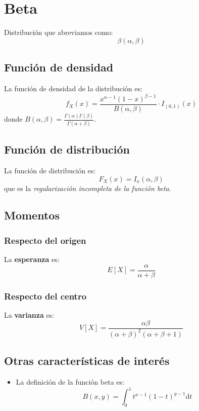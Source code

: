 \section{Beta}
\label{sec:beta}
Distribución que abreviamos como:
\[
\boxed{\beta\left( \alpha, \beta \right)}
\]

\subsection{Función de densidad}
La función de densidad de la distribución es:
\[
f_X \left( x \right) = \frac{x^{\alpha - 1} \left( 1 - x \right)^{\beta - 1}}{B\left( \alpha, \beta \right)} \cdot I_{\left( 0, 1 \right)} \left( x \right)
\]
donde $B\left( \alpha, \beta \right) = \frac{\Gamma\left( \alpha \right)\Gamma\left( \beta \right)}{\Gamma\left( \alpha + \beta \right)}$.

\subsection{Función de distribución}
La función de distribución es:
\[
F_X\left( x \right) = I_x\left( \alpha, \beta \right)
\]
que es la \textit{regularización incompleta de la función beta}.%

\subsection{Momentos}

\subsubsection*{Respecto del origen}
La \textbf{esperanza} es: 
\[
    E\left[ X \right] = \frac{\alpha}{\alpha + \beta}
\]
\subsubsection*{Respecto del centro}
La \textbf{varianza} es:
\[
    V\left[ X \right] = \frac{\alpha \beta}{\left( \alpha + \beta \right)^2 \left( \alpha + \beta + 1 \right)}
\]

\subsection{Otras características de interés}
\begin{itemize}
    \item La definición de la función beta es:
    \[
    B\left( x, y \right) = \int_{0}^1 t^{x - 1} \left( 1 - t \right)^{y - 1} \mathrm{d}t
    \]
\end{itemize}
